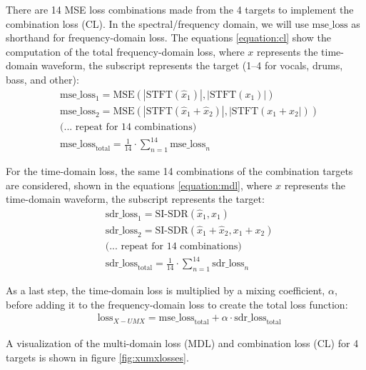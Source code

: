 \documentclass[report.tex]{subfiles}
\begin{document}
There are 14 MSE loss combinations made from the 4 targets to implement the combination loss (CL). In the spectral/frequency domain, we will use $\text{mse\_loss}$ as shorthand for frequency-domain loss. The equations \eqref{equation:cl} show the computation of the total frequency-domain loss, where $x$ represents the time-domain waveform, the subscript represents the target (1--4 for vocals, drums, bass, and other):
\begin{align}\tag{5}\label{equation:cl}
	\nonumber & \text{mse\_loss}_{1} = \text{MSE}(|\text{STFT}(\hat{x}_{1})|, |\text{STFT}(x_{1})|)\\
	\nonumber & \text{mse\_loss}_{2} = \text{MSE}(|\text{STFT}(\hat{x}_{1} + \hat{x}_{2})|, |\text{STFT}(x_{1} + x_{2}|))\\
	\nonumber & \text{(... repeat for 14 combinations)}\\
	\nonumber & \text{mse\_loss}_{\text{total}} = \frac{1}{14} \cdot \sum_{n = 1}^{14}{\text{mse\_loss}_{n}}
\end{align}

For the time-domain loss, the same 14 combinations of the combination targets are considered, shown in the equations \eqref{equation:mdl}, where $x$ represents the time-domain waveform, the subscript represents the target:
\begin{align}\tag{6}\label{equation:mdl}
	\nonumber & \text{sdr\_loss}_{1} = \text{SI-SDR}(\hat{x}_{1}, x_{1})\\
	\nonumber & \text{sdr\_loss}_{2} = \text{SI-SDR}(\hat{x}_{1} + \hat{x}_{2}, x_{1} + x_{2})\\
	\nonumber & \text{(... repeat for 14 combinations)}\\
	\nonumber & \text{sdr\_loss}_{\text{total}} = \frac{1}{14} \cdot \sum_{n = 1}^{14}{\text{sdr\_loss}_{n}}
\end{align}

As a last step, the time-domain loss is multiplied by a mixing coefficient, $\alpha$, before adding it to the frequency-domain loss to create the total loss function:
\begin{align}
	\nonumber & \text{loss}_{X-UMX} = \text{mse\_loss}_{\text{total}} + \alpha \cdot \text{sdr\_loss}_{\text{total}}
\end{align}

 A visualization of the multi-domain loss (MDL) and combination loss (CL) for 4 targets is shown in figure \ref{fig:xumxlosses}.
\end{document}
